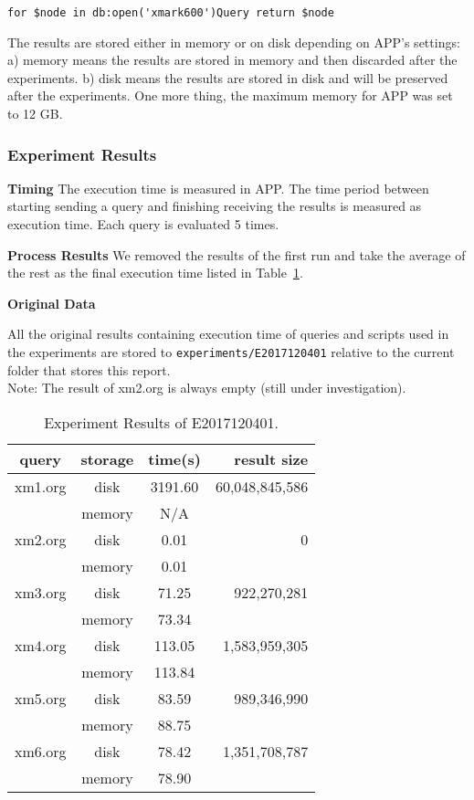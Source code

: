 \verb|for $node in db:open('xmark600')Query return $node|

The results are stored either in memory or on disk depending on APP's settings:
a) memory means the results are stored in memory and then discarded after the
experiments. b) disk means the results are stored in disk and will be preserved
after the experiments. One more thing, the maximum memory for APP was set to 12 GB.


\subsubsection{Experiment Results}

\textbf{Timing} The execution time is measured in APP. The time period between
starting sending a query and finishing receiving the results is measured as
execution time. Each query is evaluated 5 times. 

\textbf{Process Results}
We removed the results of the first run and take the average of the rest as
the final execution time listed in Table~\ref{table:E2017120401_1}.


\textbf{Original Data}

All the original results containing execution time of queries and scripts used 
in the experiments  are stored to \texttt{experiments/E2017120401} relative to
the current folder that stores this report.\\

Note: The result of xm2.org is always empty (still under investigation).


\begin{table}[t]
	\caption{Experiment Results of E2017120401.}
	\label{table:E2017120401_1}
	\centering
	\begin{tabular}{c|c|c|r}
 		\hline \hline
 query  & storage & time(s)  &   result size  \\
 \hline \hline
 xm1.org &  disk   & 3191.60  & 60,048,845,586 \\
         & memory  &    N/A   &  \\
 \hline
 xm2.org &  disk   &    0.01  &              0 \\
         & memory  &    0.01  &  \\
  \hline
 xm3.org &  disk   &  71.25  &    922,270,281 \\
         & memory  &  73.34  &  \\
  \hline
 xm4.org &  disk   &  113.05  &  1,583,959,305 \\
         & memory  &  113.84  &  \\
  \hline
 xm5.org &  disk   &  83.59  &    989,346,990 \\
         & memory  &  88.75   &   \\
  \hline
 xm6.org &  disk   &  78.42   &  1,351,708,787 \\
         & memory  &  78.90   &   \\
 \hline \hline
	\end{tabular}
\end{table}





